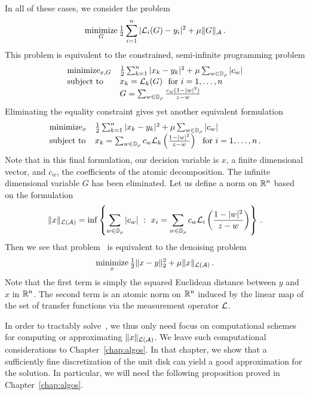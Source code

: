 In all of these cases, we consider the problem
\begin{equation}\label{eq:atomic-norm-lin-inverse}
	\mathop{\operatorname{minimize}}_{G} \tfrac{1}{2} \sum_{i=1}^n |\mathcal{L}_i(G) - y_i |^2 + \mu \|G\|_{\mathcal{A}}\,.
\end{equation}
This problem is equivalent to the constrained, semi-infinite programming problem
\[
	\begin{array}{ll}
	\mathop{\operatorname{minimize}}_{x,G} & \tfrac{1}{2}\sum_{k=1}^n |x_k - y_k |^2 + \mu \sum_{w\in \mathbb{D}_\rho} |c_w|\\
	\mbox{subject to} & x_k = \mathcal{L}_k(G)~~\mbox{for}~i=1,\ldots, n\\
	& G = \sum_{w\in \mathbb{D}_\rho} \frac{c_w(1-|w|^2)}{z-w}
	\end{array}
\]
Eliminating the equality constraint gives yet another equivalent formulation
\begin{equation}\label{eq:atomic-norm-lin-inverse-finite-dim}
	\begin{array}{ll}
	\mathop{\operatorname{minimize}}_{x} & \tfrac{1}{2}\sum_{k=1}^n |x_k - y_k |^2 + \mu \sum_{w\in \mathbb{D}_\rho} |c_w|\\
	\mbox{subject to} & x_k = \sum_{w\in \mathbb{D}_\rho} c_w \mathcal{L}_k\left(\frac{1-|w|^2}{z-w}\right)~~\mbox{for}~i=1,\ldots, n\,.
	\end{array}
\end{equation}
Note that in this final formulation, our decision variable is $x$, a finite dimensional vector, and $c_w$, the coefficients of the atomic decomposition.  The infinite dimensional variable $G$ has been eliminated.  Let us define a norm on $\mathbb{R}^n$ based on the formulation~
\[
	\|x\|_{\mathcal{L}(\mathcal{A})} = \inf \left\{ \sum_{w\in \mathbb{D}_\rho} |c_w| ~:~ x_i = \sum_{w\in\mathbb{D}_\rho} c_w\mathcal{L}_i\left(\frac{1-|w|^2}{z-w} \right)\right\}\,.
\]
Then we see that problem~ is equivalent to the denoising problem
\begin{equation}\label{eq:finite-dim-ast}
	\mathop{\operatorname{minimize}}_{x} \tfrac{1}{2}\|x-y\|_2^2 + \mu \|x\|_{\mathcal{L}(\mathcal{A})}\,.
\end{equation}
Note that the first term is simply the squared Euclidean distance between $y$
and $x$ in $\mathbb{R}^n$. The second term is an atomic norm on $\mathbb{R}^n$ induced by the
linear map of the set of transfer functions via the measurement operator $\mathcal{L}$.

In order to tractably solve~, we thus only need
focus on computational schemes for computing or approximating
$\|x\|_{\mathcal{L}(\mathcal{A})}$. We leave such computational considerations to
Chapter~\ref{chap:algos}. In that chapter, we show that a sufficiently fine
discretization of the unit disk can yield a good approximation for the solution.
In particular, we will need the following proposition proved in Chapter~\ref{chap:algos}.

